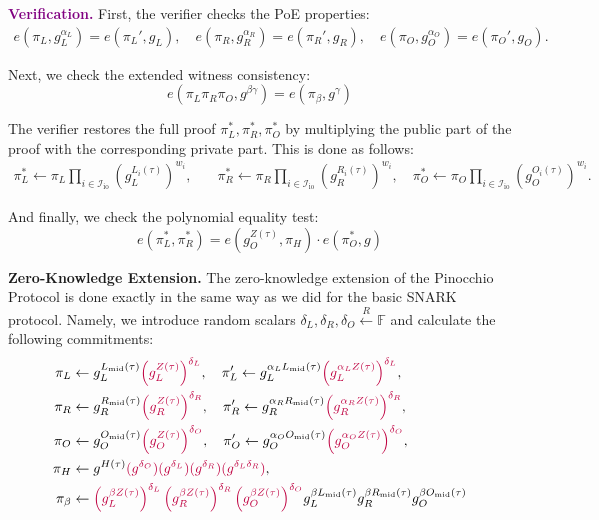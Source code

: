 \documentclass[../lecture-notes.tex]{subfiles}
\begin{document}
\textcolor{purple}{\textbf{Verification.}} First, the verifier checks the PoE properties:
\begin{align*}
    e(\pi_L, g_L^{\alpha_L}) = e(\pi_L', g_L), \quad e(\pi_R, g_R^{\alpha_R}) = e(\pi_R', g_R), \quad e(\pi_O, g_O^{\alpha_O}) = e(\pi_O', g_O).
\end{align*}

Next, we check the extended witness consistency:
\begin{equation*}
    e(\pi_L\pi_R\pi_O, g^{\beta\gamma}) = e(\pi_{\beta}, g^{\gamma})
\end{equation*}

The verifier restores the full proof $\pi_L^*,\pi_R^*,\pi_O^*$ by multiplying the public part of the proof with the corresponding private part. This is done as follows:
\begin{align*}
    \pi_L^* \gets \pi_L\prod_{i \in \mathcal{I}_{\text{io}}} (g_L^{L_i(\tau)})^{w_i}, & \quad \pi_R^* \gets \pi_R\prod_{i \in \mathcal{I}_{\text{io}}} (g_R^{R_i(\tau)})^{w_i}, \quad \pi_O^* \gets \pi_O\prod_{i \in \mathcal{I}_{\text{io}}} (g_O^{O_i(\tau)})^{w_i}.
\end{align*}

And finally, we check the polynomial equality test:
\begin{equation*}
    e(\pi_L^*, \pi_R^*) = e(g_O^{Z(\tau)}, \pi_H)\cdot e(\pi_O^*, g)
\end{equation*}

\textcolor{blue!75!gray}{\textbf{Zero-Knowledge Extension.}} The zero-knowledge extension of the Pinocchio Protocol is done exactly in the same way as we did for the basic SNARK protocol. Namely, we introduce random scalars $\delta_L, \delta_R, \delta_O \xleftarrow{R} \mathbb{F}$ and calculate the following commitments:
\begin{align*}
    \pi_L &\gets g_L^{L_{\text{mid}}(\tau)}\textcolor{purple}{\left(g_L^{Z(\tau)}\right)^{\delta_L}}, \quad \pi_L' \gets g_L^{\alpha_LL_{\text{mid}}(\tau)}\textcolor{purple}{\left(g_L^{\alpha_L Z(\tau)}\right)^{\delta_L}}, \\
    \pi_R &\gets g_R^{R_{\text{mid}}(\tau)}\textcolor{purple}{\left(g_R^{Z(\tau)}\right)^{\delta_R}}, \quad \pi_R' \gets g_R^{\alpha_RR_{\text{mid}}(\tau)}\textcolor{purple}{\left(g_R^{\alpha_R Z(\tau)}\right)^{\delta_R}}, \\
    \pi_O &\gets g_O^{O_{\text{mid}}(\tau)}\textcolor{purple}{\left(g_O^{Z(\tau)}\right)^{\delta_O}}, \quad \pi_O' \gets g_O^{\alpha_OO_{\text{mid}}(\tau)}\textcolor{purple}{\left(g_O^{\alpha_O Z(\tau)}\right)^{\delta_O}}, \\
    \pi_H &\gets g^{H(\tau)}\textcolor{purple}{(g^{\delta_O})(g^{\delta_L})(g^{\delta_R})(g^{\delta_L\delta_R})}, \\ 
    \pi_{\beta} &\gets \textcolor{purple}{\left(g_L^{\beta Z(\tau)}\right)^{\delta_L}\left(g_R^{\beta Z(\tau)}\right)^{\delta_R}\left(g_O^{\beta Z(\tau)}\right)^{\delta_O}}g_L^{\beta L_{\text{mid}}(\tau)}g_R^{\beta R_{\text{mid}}(\tau)}g_O^{\beta O_{\text{mid}}(\tau)}
\end{align*}
\end{document}

